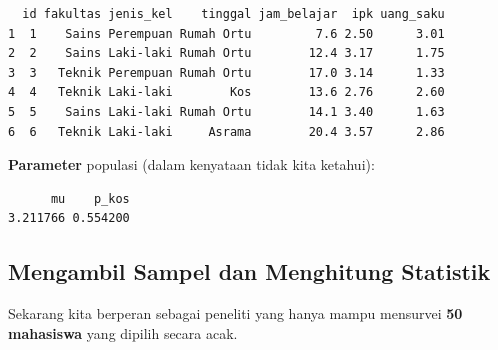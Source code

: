 \documentclass[
  indonesian,
  letterpaper,
]{book}
\newenvironment{Shaded}{\begin{snugshade}}{\end{snugshade}}
\newcommand{\AttributeTok}[1]{\textcolor[rgb]{0.40,0.45,0.13}{#1}}
\newcommand{\CommentTok}[1]{\textcolor[rgb]{0.37,0.37,0.37}{#1}}
\newcommand{\DecValTok}[1]{\textcolor[rgb]{0.68,0.00,0.00}{#1}}
\newcommand{\FunctionTok}[1]{\textcolor[rgb]{0.28,0.35,0.67}{#1}}
\newcommand{\NormalTok}[1]{\textcolor[rgb]{0.00,0.23,0.31}{#1}}
\newcommand{\OtherTok}[1]{\textcolor[rgb]{0.00,0.23,0.31}{#1}}
\newcommand{\SpecialCharTok}[1]{\textcolor[rgb]{0.37,0.37,0.37}{#1}}
\newcommand{\StringTok}[1]{\textcolor[rgb]{0.13,0.47,0.30}{#1}}
\begin{document}
\begin{verbatim}
  id fakultas jenis_kel    tinggal jam_belajar  ipk uang_saku
1  1    Sains Perempuan Rumah Ortu         7.6 2.50      3.01
2  2    Sains Laki-laki Rumah Ortu        12.4 3.17      1.75
3  3   Teknik Perempuan Rumah Ortu        17.0 3.14      1.33
4  4   Teknik Laki-laki        Kos        13.6 2.76      2.60
5  5    Sains Laki-laki Rumah Ortu        14.1 3.40      1.63
6  6   Teknik Laki-laki     Asrama        20.4 3.57      2.86
\end{verbatim}

\textbf{Parameter} populasi (dalam kenyataan tidak kita ketahui):

\begin{Shaded}
\end{Shaded}

\begin{verbatim}
      mu    p_kos 
3.211766 0.554200 
\end{verbatim}

\subsection{Mengambil Sampel dan Menghitung
Statistik}\label{mengambil-sampel-dan-menghitung-statistik}

Sekarang kita berperan sebagai peneliti yang hanya mampu mensurvei
\textbf{50 mahasiswa} yang dipilih secara acak.

\begin{Shaded}
\end{Shaded}
\end{document}
